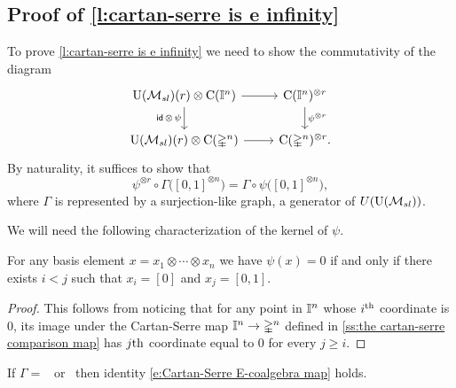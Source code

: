 
\subsection{Proof of \cref{l:cartan-serre is e infinity}} \label{ss:comparison proof}

To prove \cref{l:cartan-serre is e infinity} we need to show the commutativity of the diagram
\[
\begin{tikzcd}
\USL(r) \otimes \gchains(\gcube^n) \arrow[r] \arrow[d, "\id\, \otimes\, \psi"'] &
\gchains(\gcube^n)^{\otimes r} \arrow[d, "\psi^{\otimes r}"] \\
\USL(r) \otimes \gchains(\gsimplex^n) \arrow[r] &
\gchains(\gsimplex^n)^{\otimes r}.
\end{tikzcd}
\]
By naturality, it suffices to show that
\begin{equation} \label{e:Cartan-Serre E-coalgebra map}
\psi^{\otimes r} \circ \Gamma\big( [0,1]^{\otimes n} \big) = \Gamma \circ \psi \big( [0,1]^{\otimes n} \big),
\end{equation}
where $\Gamma$ is represented by a surjection-like graph, a generator of $U({\operatorname{U}(\mathcal{M}_{sl})})$.

We will need the following characterization of the kernel of $\psi$.
\begin{lemma} \label{l:kernel of psi}
	For any basis element $x = x_1 \otimes \cdots \otimes x_n$ we have $\psi(x) = 0$ if and only if there exists $i < j$ such that $x_i = [0]$ and $x_j = [0,1]$.
\end{lemma}

\begin{proof}
	This follows from noticing that for any point in $\mathbb{I}^n$ whose $i^{\mathrm{th}}$ coordinate is $0$, its image under the Cartan-Serre map $\mathbb{I}^n \to \mathbb{\Delta}^n$ defined in \cref{ss:the cartan-serre comparison map} has $j\mathrm{th}$ coordinate equal to $0$ for every $j \geq i$.
\end{proof}

\begin{lemma}
	If $\Gamma =$ \counit \ or \coproduct \ then identity \eqref{e:Cartan-Serre E-coalgebra map} holds.
\end{lemma}

